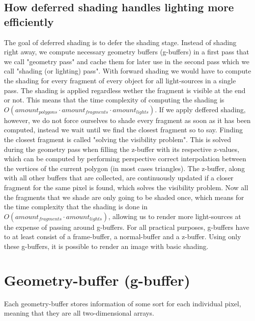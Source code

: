 \documentclass{ACGSeminar}
\begin{document}
	\subsection{How deferred shading handles lighting more efficiently}
		The goal of deferred shading is to defer the shading stage. %
		Instead of shading right away, we compute necessary geometry buffers (g-buffers) in a first pass that we call "geometry pass" and cache 
		them for later use in the second pass which we call "shading (or lighting) pass". With forward shading we would have to compute the shading for every fragment of every object for all light-sources in a single pass. The shading is applied regardless wether the fragment is visible at the end or not. This means that the time complexity of computing the shading is $O(amount_{polygons} \cdot amount_{fragments} \cdot amount_{lights})$. If we apply deffered shading, however, we do not force ourselves to shade every fragment as soon as it has been computed, instead we wait until we find the closest fragment so to say. Finding the closest fragment is called "solving the visibility problem". This is solved during the geometry pass when filling the z-buffer with its respective z-values, which can be computed by performing perspective correct interpolation between the vertices of the current polygon (in most cases triangles). The z-buffer, along with all other buffers that are collected, are continuously updated if a closer fragment for the same pixel is found, which solves the visibility problem. Now all the fragments that we shade are only going to be shaded once, which means for the time complexity that the shading is done in $O(amount_{fragments} \cdot amount_{lights})$, allowing us to render more light-sources at the expense of passing around g-buffers. For all practical purposes, g-buffers have to at least consist of a frame-buffer, a normal-buffer and a z-buffer. Using only these g-buffers, it is possible to render an image with basic shading.

\section{Geometry-buffer (g-buffer)}
	Each geometry-buffer stores information of some sort for each individual pixel, meaning that they are all two-dimensional arrays.
\end{document}
